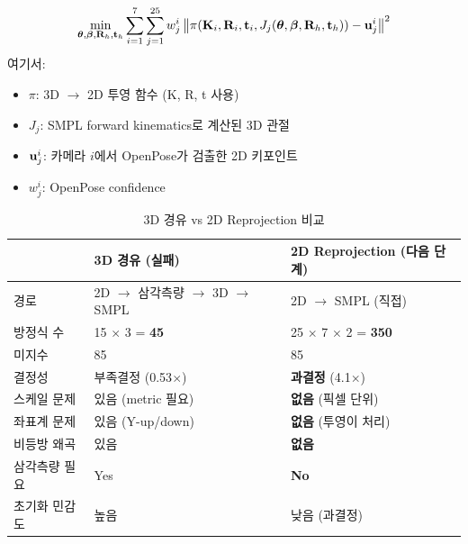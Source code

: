 \documentclass[11pt, a4paper]{report}
\begin{document}
\begin{keyidea}[title={2D Reprojection SMPL 피팅}]
\begin{equation}
\min_{\bm{\theta}, \bm{\beta}, \mathbf{R}_h, \mathbf{t}_h} \sum_{i=1}^{7} \sum_{j=1}^{25} w_j^i \left\| \pi(\mathbf{K}_i, \mathbf{R}_i, \mathbf{t}_i, J_j(\bm{\theta}, \bm{\beta}, \mathbf{R}_h, \mathbf{t}_h)) - \mathbf{u}_j^i \right\|^2
\end{equation}
여기서:
\begin{itemize}[leftmargin=*]
  \item $\pi$: 3D $\rightarrow$ 2D 투영 함수 (K, R, t 사용)
  \item $J_j$: SMPL forward kinematics로 계산된 3D 관절
  \item $\mathbf{u}_j^i$: 카메라 $i$에서 OpenPose가 검출한 2D 키포인트
  \item $w_j^i$: OpenPose confidence
\end{itemize}
\end{keyidea}

\begin{table}[H]
\centering
\caption{3D 경유 vs 2D Reprojection 비교}
\renewcommand{\arraystretch}{1.4}
\begin{tabular}{p{4cm} p{5cm} p{5cm}}
\toprule
& \textbf{3D 경유 (실패)} & \textbf{2D Reprojection (다음 단계)} \\
\midrule
경로 & 2D $\rightarrow$ 삼각측량 $\rightarrow$ 3D $\rightarrow$ SMPL & 2D $\rightarrow$ SMPL (직접) \\
\midrule
방정식 수 & 15 $\times$ 3 = \textbf{45} & 25 $\times$ 7 $\times$ 2 = \textbf{350} \\
미지수 & 85 & 85 \\
결정성 & \textcolor{hard}{부족결정} (0.53$\times$) & \textcolor{solvable}{\textbf{과결정}} (4.1$\times$) \\
\midrule
스케일 문제 & \textcolor{hard}{있음} (metric 필요) & \textcolor{solvable}{\textbf{없음}} (픽셀 단위) \\
좌표계 문제 & \textcolor{hard}{있음} (Y-up/down) & \textcolor{solvable}{\textbf{없음}} (투영이 처리) \\
비등방 왜곡 & \textcolor{hard}{있음} & \textcolor{solvable}{\textbf{없음}} \\
\midrule
삼각측량 필요 & Yes & \textbf{No} \\
초기화 민감도 & 높음 & 낮음 (과결정) \\
\bottomrule
\end{tabular}
\end{table}
\end{document}
